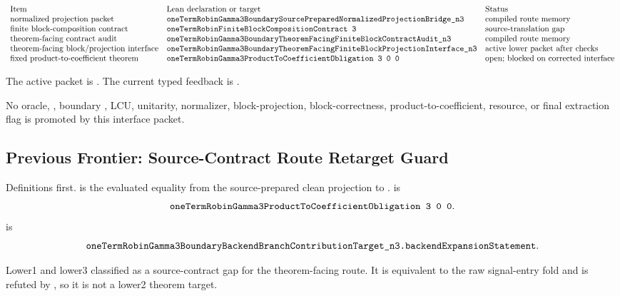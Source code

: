 \[
\begin{array}{lll}
\text{Item} & \text{Lean declaration or target} & \text{Status}\\
\text{normalized projection packet} &
\texttt{oneTermRobinGamma3BoundarySourcePreparedNormalizedProjectionBridge\_n3} &
\text{compiled route memory}\\
\text{finite block-composition contract} &
\texttt{oneTermRobinFiniteBlockCompositionContract\ 3} &
\text{source-translation gap}\\
\text{theorem-facing contract audit} &
\texttt{oneTermRobinGamma3BoundaryTheoremFacingFiniteBlockContractAudit\_n3} &
\text{compiled route memory}\\
\text{theorem-facing block/projection interface} &
\texttt{oneTermRobinGamma3BoundaryTheoremFacingFiniteBlockProjectionInterface\_n3} &
\text{active lower packet after checks}\\
\text{fixed product-to-coefficient theorem} &
\texttt{oneTermRobinGamma3ProductToCoefficientObligation\ 3\ 0\ 0} &
\text{open; blocked on corrected interface}
\end{array}
\]

The active packet is
.
The current typed feedback is
.

No oracle, , boundary , LCU, unitarity, normalizer,
block-projection, block-correctness, product-to-coefficient, resource, or final
extraction flag is promoted by this interface packet.

\subsection{Previous Frontier: Source-Contract Route Retarget Guard}

Definitions first.   is the evaluated equality
from the source-prepared clean projection to
.
 is
\[
  \Lean{oneTermRobinGamma3ProductToCoefficientObligation\ 3\ 0\ 0}.
\]
 is
\[
  \texttt{oneTermRobinGamma3BoundaryBackendBranchContributionTarget\_n3.backendExpansionStatement}.
\]

Lower1 and lower3 classified  as a source-contract
gap for the theorem-facing route.  It is equivalent to the raw signal-entry
fold and is refuted by
, so it is
not a lower2 theorem target.

